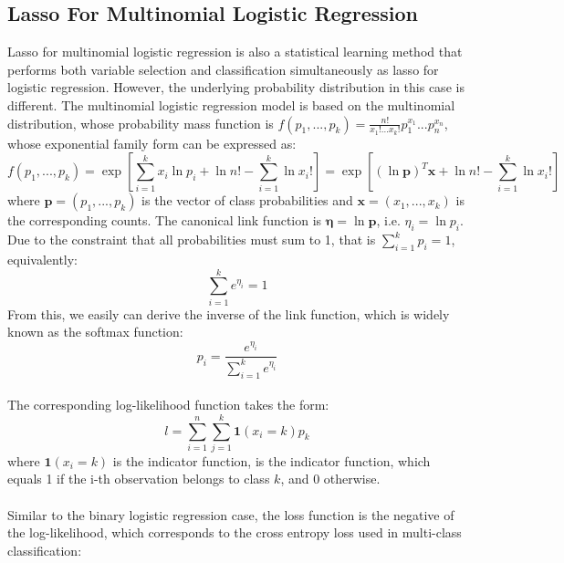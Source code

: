 \subsection{Lasso For Multinomial Logistic Regression}\label{subsec:MLR}
Lasso for multinomial logistic regression is also a statistical learning method that performs both variable selection and classification simultaneously as lasso for logistic regression. However, the underlying probability distribution in this case is different. The multinomial logistic regression model is based on the multinomial distribution, whose probability mass function is $f(p_1,...,p_k)=\frac{n!}{x_1!...x_k!} p_1^{x_1}...p_n^{x_n}$, whose exponential family form can be expressed as:\\
\begin{equation}
	f(p_1,...,p_k)=\exp[\sum_{i=1}^k x_i\ln p_i+\ln n!-\sum_{i=1}^k\ln x_i!]=\exp[(\ln\boldsymbol{p})^T\boldsymbol{x} +\ln n!-\sum_{i=1}^k\ln x_i!]
\end{equation}
where $\boldsymbol{p}=(p_1,...,p_k)$ is the vector of class probabilities and $\boldsymbol{x}=(x_1,...,x_k)$ is the corresponding counts. The canonical link function is $\boldsymbol{\eta}=\ln\boldsymbol{p}$, i.e. $\eta_i=\ln p_i$. Due to the constraint that all probabilities must sum to 1, that is $\sum_{i=1}^k p_i=1$, equivalently:
\begin{equation}
 	\sum_{i=1}^k e^{\eta_i}=1
\end{equation}
From this, we easily can derive the inverse of the link function, which is widely known as the softmax function:\\
\begin{equation}
	p_i=\frac{e^{\eta_i}}{\sum_{i=1}^k e^{\eta_i}}
\end{equation}\\
The corresponding log-likelihood function takes the form:\\
\begin{equation}
	l=\sum_{i=1}^{n}\sum_{j=1}^k \boldsymbol{1}(x_i=k)p_k
\end{equation}
where $\boldsymbol{1}(x_i=k)$ is the indicator function, is the indicator function, which equals 1 if the i-th observation belongs to class $k$, and 0 otherwise.\\
\\ 
Similar to the binary logistic regression case, the loss function is the negative of the log-likelihood, which corresponds to the cross entropy loss used in multi-class classification:\\
